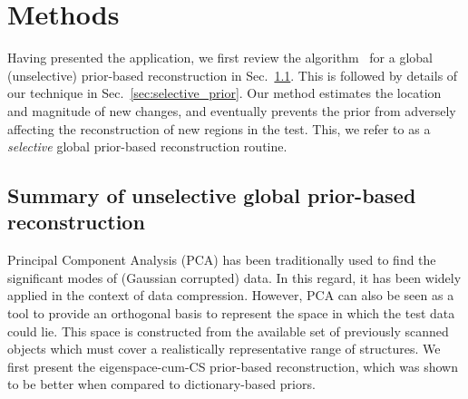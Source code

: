 \documentclass[journal]{IEEEtran}
\begin{document}
\section{Methods}
\label{sec:methods}
Having presented the application, we first review the algorithm~\cite{my_dicta_paper} for a global (unselective) prior-based reconstruction in Sec.~\ref{sec:unselective_global_prior}. This is followed by details of our technique in Sec.~\ref{sec:selective_prior}. Our method estimates the location and magnitude of new changes, and eventually prevents the prior from adversely affecting the reconstruction of new regions in the test. This, we refer to as a \textit{selective} global prior-based reconstruction routine.
\subsection{\textbf{Summary of unselective global prior-based reconstruction}}
\label{sec:unselective_global_prior}

Principal Component Analysis (PCA) has been traditionally used to find the significant modes of (Gaussian corrupted) data. In this regard, it has been widely applied in the context of data compression. However, PCA can also be seen as a tool to provide an orthogonal basis to represent the space in which the test data could lie. This space is constructed from the available set of previously scanned objects which must cover a realistically representative range of structures. We first present the eigenspace-cum-CS prior-based reconstruction, which was shown~\cite{my_dicta_paper} to be better when compared to dictionary-based priors. %
\end{document}

